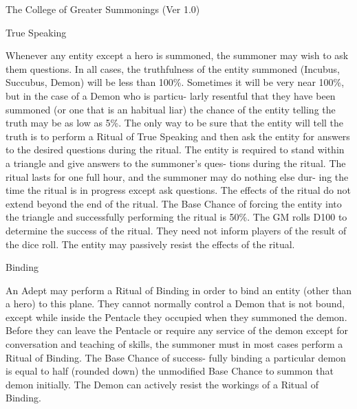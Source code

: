 \begin{Chapter}{The College of Greater Summonings (Ver 1.0)}
\begin{ritual}[Q-5]{True Speaking }
\begin{effects}
 Whenever  any  entity  except  a  hero  is 
summoned,  the  summoner  may  wish  to  ask  them 
questions. In all cases, the truthfulness of the entity 
summoned  (Incubus,  Succubus,  Demon)  will  be 
less  than  100\%.  Sometimes  it  will  be  very  near 
100\%, but in the case of a Demon  who is particu-
larly  resentful  that  they  have  been  summoned  (or 
one that is an habitual liar) the chance of the entity 
telling  the  truth  may  be  as  low  as  5\%.  The  only 
way to be sure that the entity will tell the truth is to 
perform a Ritual of True Speaking and then ask the 
entity  for  answers  to  the  desired  questions  during 
the  ritual.  The  entity  is  required  to  stand  within  a 
triangle and give answers to the summoner’s ques-
tions during  the  ritual.  The  ritual  lasts  for  one  full 
hour,  and  the  summoner  may  do nothing  else  dur-
ing  the  time  the  ritual  is  in  progress  except  ask 
questions.  The  effects  of  the  ritual  do  not  extend 
beyond  the  end  of  the  ritual.  The  Base  Chance  of 
forcing the entity into the triangle and successfully 
performing  the  ritual  is  50\%.  The  GM  rolls  D100 
to  determine  the  success  of  the  ritual.  They  need 
not inform players of the result of the dice roll. The 
entity may passively resist the effects of the ritual. 

\end{effects}
\end{ritual}

\begin{ritual}[Q-6]{Binding }

\begin{effects}
An Adept may perform a Ritual of Binding 
in order to bind an entity (other than a hero) to this 
plane. They cannot normally control a Demon that 
is not bound, except while inside the Pentacle they 
occupied when they summoned the demon. Before 
they  can  leave  the  Pentacle  or  require  any  service 
of the demon except for conversation and teaching 
of skills, the summoner must in most cases perform 
a  Ritual  of  Binding.  The  Base  Chance  of  success-
fully  binding  a  particular  demon  is  equal  to  half 
(rounded  down)  the  unmodified  Base  Chance  to 
summon  that  demon  initially.  The  Demon  can 
actively resist the workings of a Ritual of Binding. 


\end{effects}
\end{ritual}
\end{Chapter}
